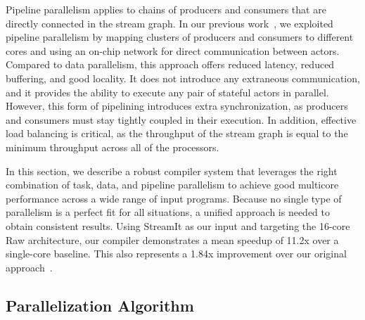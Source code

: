 Pipeline parallelism applies to chains of producers and consumers that
are directly connected in the stream graph.  In our previous
work~\cite{streamit-asplos}, we exploited pipeline parallelism by
mapping clusters of producers and consumers to different cores and
using an on-chip network for direct communication between actors.
Compared to data parallelism, this approach offers reduced latency,
reduced buffering, and good locality.  It does not introduce any
extraneous communication, and it provides the ability to execute any
pair of stateful actors in parallel.  However, this form of pipelining
introduces extra synchronization, as producers and consumers must stay
tightly coupled in their execution.  In addition, effective load
balancing is critical, as the throughput of the stream graph is equal
to the minimum throughput across all of the processors.

In this section, we describe a robust compiler system that leverages
the right combination of task, data, and pipeline parallelism to
achieve good multicore performance across a wide range of input
programs.  Because no single type of parallelism is a perfect fit for
all situations, a unified approach is needed to obtain consistent
results.  Using StreamIt as our input and targeting the 16-core Raw
architecture, our compiler demonstrates a mean speedup of 11.2x over a
single-core baseline.  This also represents a 1.84x improvement over
our original approach~\cite{streamit-asplos}.

\subsection*{Parallelization Algorithm}

